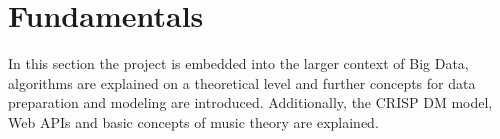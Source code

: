 \newpage
\section{Fundamentals}

In this section the project is embedded into the larger context of Big Data,
algorithms are explained on a theoretical level and further concepts for data preparation
and modeling are introduced.
Additionally, the \ac{CRISP DM} model, Web APIs and basic concepts of music theory are explained.